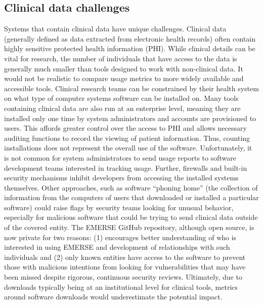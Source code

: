 \documentclass{article}
\begin{document}
\subsection{Clinical data challenges}

Systems that contain clinical data have unique challenges.  Clinical data (generally defined as data extracted from electronic health records) often contain highly sensitive protected health information (PHI). While clinical details can be vital for research, the number of individuals that have access to the data is generally much smaller than tools designed to work with non-clinical data. It would not be realistic to compare usage metrics to more widely available and accessible tools. Clinical research teams can be constrained by their health system on what type of computer systems software can be installed on. Many tools containing clinical data are also run at an enterprise level, meaning they are installed only one time by system administrators and accounts are provisioned to users. This affords greater control over the access to PHI and allows necessary auditing functions to record the viewing of patient information.  Thus, counting installations does not represent the overall use of the software. Unfortunately, it is not common for system administrators to send usage reports to software development teams interested in tracking usage.  Further, firewalls and built-in security mechanisms inhibit developers from accessing the installed systems themselves. Other approaches, such as software “phoning home” (the collection of information from the computers of users that downloaded or installed a particular software) could raise flags by security teams looking for unusual behavior, especially for malicious software that could be trying to send clinical data outside of the covered entity. The EMERSE \cite{hanauer_supporting_2015} GitHub repository, although open source, is now private for two reasons: (1) encourages  better understanding of who is interested in using EMERSE and development of relationships with such individuals and (2)  only known entities have access to the software to prevent those with malicious intentions from looking for vulnerabilities that may have been missed despite rigorous, continuous security reviews.  Ultimately, due to downloads typically being at an institutional level for clinical tools, metrics around software downloads would underestimate the potential impact.  
\end{document}
